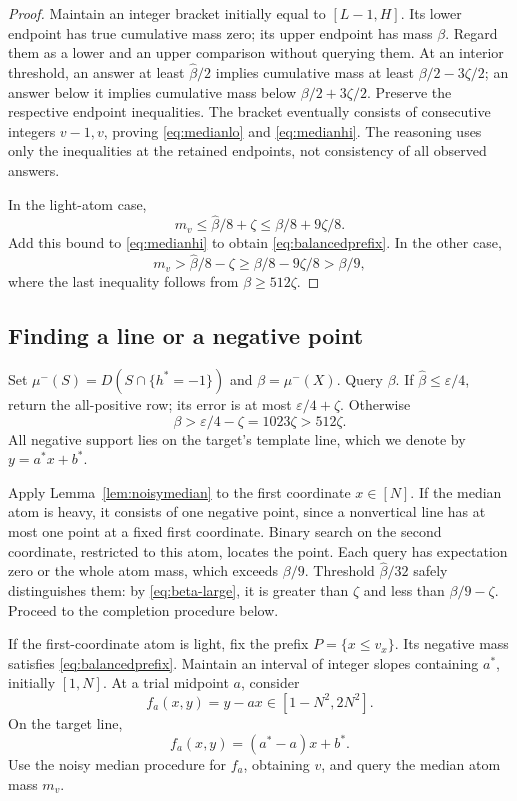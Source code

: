 \documentclass[11pt,letterpaper,pmlr,twoside]{jmlr}
\newcommand{\eps}{\varepsilon}
\begin{document}
\begin{proof}
Maintain an integer bracket initially equal to $[L-1,H]$. Its lower endpoint has true cumulative mass zero; its upper endpoint has mass $\beta$. Regard them as a lower and an upper comparison without querying them. At an interior threshold, an answer at least $\hat\beta/2$ implies cumulative mass at least $\beta/2-3\zeta/2$; an answer below it implies cumulative mass below $\beta/2+3\zeta/2$. Preserve the respective endpoint inequalities. The bracket eventually consists of consecutive integers $v-1,v$, proving \eqref{eq:medianlo} and \eqref{eq:medianhi}. The reasoning uses only the inequalities at the retained endpoints, not consistency of all observed answers.

In the light-atom case,
\[
 m_v\le\hat\beta/8+\zeta\le\beta/8+9\zeta/8.
\]
Add this bound to \eqref{eq:medianhi} to obtain \eqref{eq:balancedprefix}. In the other case,
\[
 m_v>\hat\beta/8-\zeta\ge\beta/8-9\zeta/8>\beta/9,
\]
where the last inequality follows from $\beta\ge512\zeta$.
\end{proof}

\subsection{Finding a line or a negative point}
Set $\mu^-(S)=D(S\cap\{h^*=-1\})$ and $\beta=\mu^-(X)$. Query $\beta$. If $\hat\beta\le\eps/4$, return the all-positive row; its error is at most $\eps/4+\zeta$. Otherwise
\begin{equation}
 \beta>\eps/4-\zeta=1023\zeta>512\zeta.
\label{eq:beta-large}
\end{equation}
All negative support lies on the target's template line, which we denote by $y=a^*x+b^*$.

Apply Lemma~\ref{lem:noisymedian} to the first coordinate $x\in[N]$. If the median atom is heavy, it consists of one negative point, since a nonvertical line has at most one point at a fixed first coordinate. Binary search on the second coordinate, restricted to this atom, locates the point. Each query has expectation zero or the whole atom mass, which exceeds $\beta/9$. Threshold $\hat\beta/32$ safely distinguishes them: by \eqref{eq:beta-large}, it is greater than $\zeta$ and less than $\beta/9-\zeta$. Proceed to the completion procedure below.

If the first-coordinate atom is light, fix the prefix $P=\{x\le v_x\}$. Its negative mass satisfies \eqref{eq:balancedprefix}. Maintain an interval of integer slopes containing $a^*$, initially $[1,N]$. At a trial midpoint $a$, consider
\[
 f_a(x,y)=y-ax\in[1-N^2,2N^2].
\]
On the target line,
\begin{equation}
 f_a(x,y)=(a^*-a)x+b^*.
\label{eq:residual-on-line}
\end{equation}
Use the noisy median procedure for $f_a$, obtaining $v$, and query the median atom mass $m_v$.
\end{document}

